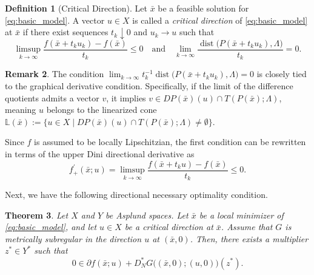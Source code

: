 \documentclass[12pt,twoside,reqno]{amsart}
\newtheorem{theorem}{Theorem}[section]
\theoremstyle{definition}
\newtheorem{definition}[theorem]{Definition}
\newtheorem{remark}[theorem]{Remark}
\numberwithin{equation}{section}
\begin{document}
\begin{definition}[Critical Direction] \label{defn:critical_direction} \cite[Definition~5]{gfrerer2013directional}
Let $\bar{x}$ be a feasible solution for \eqref{eq:basic_model}. A vector $u \in X$ is called a \emph{critical direction} of \eqref{eq:basic_model} at $\bar{x}$ if there exist sequences $t_k \downarrow 0$ and $u_k \to u$ such that 
\begin{equation} \label{eq:critical_direction_cond}
    \limsup_{k \to \infty} \frac{f(\bar{x} + t_k u_k) - f(\bar{x})}{t_k} \leq 0 \quad \text{and} \quad \lim_{k \to \infty} \frac{\operatorname{dist}\big(P(\bar{x} + t_k u_k), \Lambda\big)}{t_k} = 0.
\end{equation}
\end{definition}

\begin{remark}\label{rem:critical_direction_equivalence}
       The condition $\lim_{k \to \infty} t_k^{-1} \operatorname{dist}\big(P(\bar{x} + t_k u_k), \Lambda\big) = 0$ is closely tied to the graphical derivative condition. Specifically, if the limit of the difference quotients admits a vector $v$, it implies $v \in DP(\bar{x})(u) \cap T(P(\bar{x}); \Lambda)$, meaning $u$ belongs to the linearized cone $\mathbb{L}(\bar{x}) := \{ u \in X \mid DP(\bar{x})(u) \cap T(P(\bar{x}); \Lambda) \neq \emptyset \}$. 

      Since $f$ is assumed to be locally Lipschitzian, the first condition can be rewritten in terms of the upper Dini directional derivative as
\begin{equation*}
    f_+^\prime(\bar{x}; u) = \limsup_{k \to \infty} \frac{f(\bar{x} + t_k u) - f(\bar{x})}{t_k} \le 0.
\end{equation*}
\end{remark}

Next, we have the following directional necessary optimality condition.

\begin{theorem}\cite[Theorem~7~(ii)]{gfrerer2013directional}\label{thm:preliminary_optimality_condition}
Let $X$ and $Y$ be Asplund spaces. Let $\bar{x}$ be a local minimizer of \eqref{eq:basic_model}, and let $u \in X$ be a critical direction at $\bar{x}$. Assume that $G$ is metrically subregular in the direction $u$ at $(\bar{x}, 0)$. Then, there exists a multiplier $z^* \in Y^*$ such that
\begin{equation} \label{eq:m_stationarity}
    0 \in \partial f(\bar{x}; u) + D_N^* G\big((\bar{x}, 0); (u, 0)\big)(z^*).
\end{equation}
\end{theorem}
\end{document}
